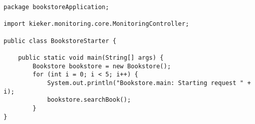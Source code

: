 \begin{lstlisting}[caption=BookstoreMonitoringStarter.java] 
package bookstoreApplication;

import kieker.monitoring.core.MonitoringController;

public class BookstoreStarter {

    public static void main(String[] args) {
        Bookstore bookstore = new Bookstore();
        for (int i = 0; i < 5; i++) {
            System.out.println("Bookstore.main: Starting request " + i);
            bookstore.searchBook();
        }
}
\end{lstlisting}